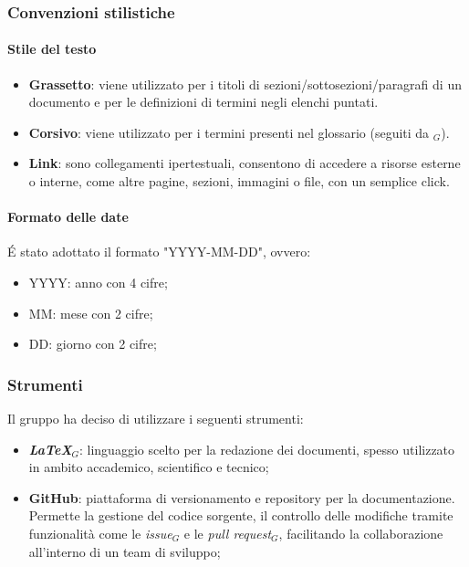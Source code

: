 \subsubsection{Convenzioni stilistiche}
    \paragraph{Stile del testo}
    \begin{itemize}
        \item \textbf{Grassetto}: viene utilizzato per i titoli di sezioni/sottosezioni/paragrafi di un documento e per le definizioni di termini negli elenchi puntati.
        \item \textbf{Corsivo}: viene utilizzato per i termini presenti nel glossario (seguiti da $_G$).
        \item \textbf{Link}: sono collegamenti ipertestuali, consentono di accedere a risorse esterne o interne, come altre pagine, sezioni, immagini o file, con un semplice click.
    \end{itemize}

    \paragraph{Formato delle date}
    \'E stato adottato il formato "YYYY-MM-DD", ovvero:
    \begin{itemize}
        \item YYYY: anno con 4 cifre;
        \item MM: mese con 2 cifre;
        \item DD: giorno con 2 cifre;
    \end{itemize}

\subsubsection{Strumenti}
Il gruppo ha deciso di utilizzare i seguenti strumenti:
\begin{itemize}
    \item \textbf{\textit{LaTeX}}$_G$: linguaggio scelto per la redazione dei documenti, spesso utilizzato in ambito accademico, scientifico e tecnico;
    \item \textbf{GitHub}: piattaforma di versionamento e repository per la documentazione. Permette la gestione del codice sorgente, il controllo delle modifiche tramite funzionalità come le \textit{issue}$_G$ e le \textit{pull request}$_G$, facilitando la collaborazione all’interno di un team di sviluppo;
\end{itemize}